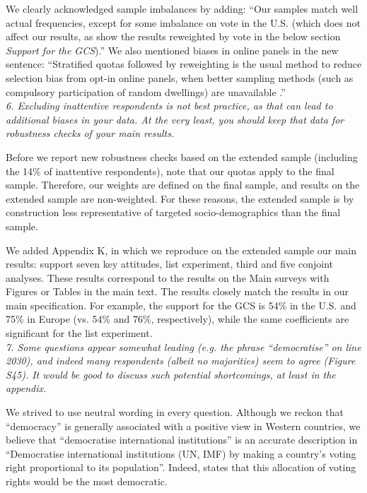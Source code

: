 \documentclass[12pt,english]{article}
\begin{document}
We clearly acknowledged sample imbalances by adding: ``Our samples match well actual frequencies, except for some imbalance on vote in the U.S. (which does not affect our results, as show the results reweighted by vote in the below section \textit{Support for the GCS}).'' We also mentioned biases in online panels in the new sentence: ``Stratified quotas followed by reweighting is the usual method to reduce selection bias from opt-in online panels, when better sampling methods (such as compulsory participation of random dwellings) are unavailable \citep{scherpenzeel_how_2010}.''
~\\

\textit{6. Excluding inattentive respondents is not best practice, as that can lead to additional biases in your data. At the very least, you should keep that data for robustness checks of your main results.}

Before we report new robustness checks based on the extended sample (including the 14\% of inattentive respondents), note that our quotas apply to the final sample. Therefore, our weights are defined on the final sample, and results on the extended sample are non-weighted. For these reasons, the extended sample is by construction less representative of targeted socio-demographics than the final sample.

We added Appendix K, in which we reproduce on the extended sample our main results: support seven key attitudes, list experiment, third and five conjoint analyses. These results correspond to the results on the Main surveys with Figures or Tables in the main text. The results closely match the results in our main specification. For example, the support for the GCS is 54\% in the U.S. and 75\% in Europe (vs. 54\% and 76\%, respectively), while the same coefficients are significant for the list experiment.
~\\

\textit{7. Some questions appear somewhat leading (e.g. the phrase “democratise” on line 2030), and indeed many respondents (albeit no majorities) seem to agree (Figure S45). It would be good to discuss such potential shortcomings, at least in the appendix.}

We strived to use neutral wording in every question. Although we reckon that ``democracy'' is generally associated with a positive view in Western countries, we believe that ``democratise international institutions'' is an accurate description in ``Democratise international institutions (UN, IMF) by making a country's voting right proportional to its population''. Indeed, \citet{woodward_imf_2007} states that this allocation of voting rights would be the most democratic.
\end{document}
